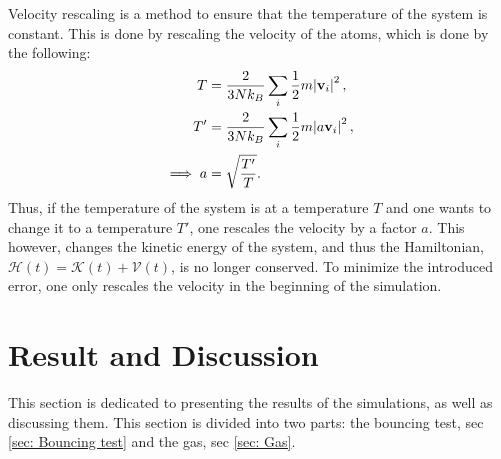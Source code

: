 \documentclass[a4paper]{article}
\newcommand{\newparagraph}{\vspace{.5cm}\noindent}
\begin{document}
\newparagraph
Velocity rescaling is a method to ensure that the temperature of the system is constant. This is done by rescaling the velocity of the atoms, which is done by the following:
\begin{align}
    T &= \frac{2}{3Nk_B}\sum_i \frac{1}{2}m\abs{\mathbf{v}_i}^2,\nonumber\\
    T' &= \frac{2}{3Nk_B}\sum_i \frac{1}{2}m\abs{a\mathbf{v}_i}^2,\nonumber\\
    \implies a &= \sqrt{\frac{T'}{T}}.\label{eq: velocity rescaling}
\end{align}Thus, if the temperature of the system is at a temperature $T$ and one wants to change it to a temperature $T'$, one rescales the velocity by a factor $a$. This however, changes the kinetic energy of the system, and thus the Hamiltonian, $\mathcal{H}(t) = \mathcal{K}(t) + \mathcal{V}(t)$, is no longer conserved.
To minimize the introduced error, one only rescales the velocity in the beginning of the simulation. 

\section{Result and Discussion}
This section is dedicated to presenting the results of the simulations, as well as discussing them. This section is divided into two parts: the bouncing test, sec \ref{sec: Bouncing test} and the gas, sec \ref{sec: Gas}.
\end{document}
